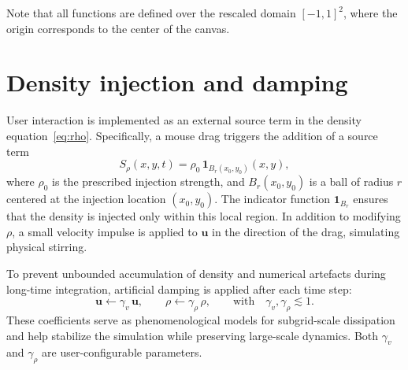 \documentclass[11pt]{article}
\begin{document}
Note that all functions are defined over the rescaled domain $[-1, 1]^2$, where the origin corresponds to the center of the canvas. 
\section{Density injection and damping}

User interaction is implemented as an external source term in the density equation~\eqref{eq:rho}. Specifically, a mouse drag triggers the addition of a source term
\[
  S_\rho(x, y, t) = \rho_0\, \mathbf{1}_{B_r(x_0, y_0)}(x, y),
\]
where $\rho_0$ is the prescribed injection strength, and $B_r(x_0, y_0)$ is a ball of radius $r$ centered at the injection location $(x_0, y_0)$. The indicator function $\mathbf{1}_{B_r}$ ensures that the density is injected only within this local region. In addition to modifying $\rho$, a small velocity impulse is applied to $\bm{u}$ in the direction of the drag, simulating physical stirring.

\medskip

To prevent unbounded accumulation of density and numerical artefacts during long-time integration, artificial damping is applied after each time step:
\[
  \bm{u} \leftarrow \gamma_v\, \bm{u},
  \qquad
  \rho \leftarrow \gamma_\rho\, \rho,
  \qquad
  \text{with} \quad \gamma_v, \gamma_\rho \lesssim 1.
\]
These coefficients serve as phenomenological models for subgrid-scale dissipation and help stabilize the simulation while preserving large-scale dynamics. Both $\gamma_v$ and $\gamma_\rho$ are user-configurable parameters.


\end{document}

